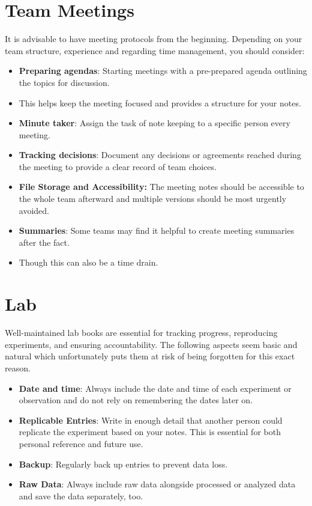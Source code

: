 \section{Team Meetings} \label{sec:team-meetings} 
It is advisable to have meeting protocols from the beginning.
Depending on your team structure, experience and regarding time management, you should consider:
\begin{itemize}
    \item \textbf{Preparing agendas}: Starting meetings with a pre-prepared agenda outlining the topics for discussion.
    \item This helps keep the meeting focused and provides a structure for your notes.
    \item \textbf{Minute taker}: Assign the task of note keeping to a specific person every meeting.
    \item \textbf{Tracking decisions}: Document any decisions or agreements reached during the meeting to provide a clear record of team choices.
    \item \textbf{File Storage and Accessibility:} The meeting notes should be accessible to the whole team afterward and multiple versions should be most urgently avoided.
    \item \textbf{Summaries}: Some teams may find it helpful to create meeting summaries after the fact.
    \item Though this can also be a time drain.
\end{itemize}
\section{Lab} \label{sec:lab} 
Well-maintained lab books are essential for tracking progress, reproducing experiments, and ensuring accountability.
The following aspects seem basic and natural which unfortunately puts them at risk of being forgotten for this exact reason.  
\begin{itemize}
    \item \textbf{Date and time}: Always include the date and time of each experiment or observation and do not rely on remembering the dates later on.
    \item \textbf{Replicable Entries}: Write in enough detail that another person could replicate the experiment based on your notes.
    This is essential for both personal reference and future use.
    \item \textbf{Backup}: Regularly back up entries to prevent data loss.
    \item \textbf{Raw Data}: Always include raw data alongside processed or analyzed data and save the data separately, too.
\end{itemize}

